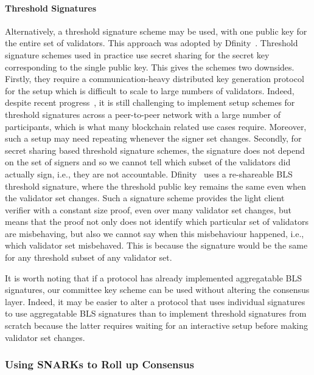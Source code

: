 \noindent \paragraph{Threshold Signatures} Alternatively, a threshold signature scheme may be used, with one public key for the entire set of validators. This approach was adopted by Dfinity~\cite{GrothDKG}. Threshold signature schemes used in practice use secret sharing for the secret key corresponding to the single public key. This gives the schemes two downsides. Firstly, they require a communication-heavy distributed key generation protocol for the setup which is difficult to scale to large numbers of validators. Indeed, despite recent progress~\cite{AggregatableDKG,GrothDKG,LWEDKG}, it is still challenging to implement setup schemes for threshold signatures across a peer-to-peer network with a large number of participants, which is what many blockchain related use cases require. Moreover, such a setup may need repeating whenever the signer set changes. Secondly, for secret sharing based threshold signature schemes, the signature does not depend on the set of signers and so we cannot tell which subset of the validators did actually sign, i.e., they are not accountable. Dfinity~\cite{GrothDKG} uses a re-shareable BLS threshold signature, where the threshold public key remains the same even when the validator set changes. Such a signature scheme
provides the light client verifier with a constant size proof, even over many validator set changes, but means that the proof not only does not identify which particular set of validators are misbehaving, but also we cannot say when this misbehaviour happened, i.e., which validator set misbehaved. This is because the signature would be the same for any threshold subset of any validator set.

\noindent It is worth noting that if a protocol has already implemented aggregatable BLS signatures, our committee key scheme can be used without altering the consensus layer. Indeed, it may be easier to alter a protocol that uses individual
signatures to use aggregatable BLS signatures than to implement threshold signatures from scratch because the latter requires waiting for an interactive setup before making validator set changes.

\subsubsection{Using SNARKs to Roll up Consensus}

